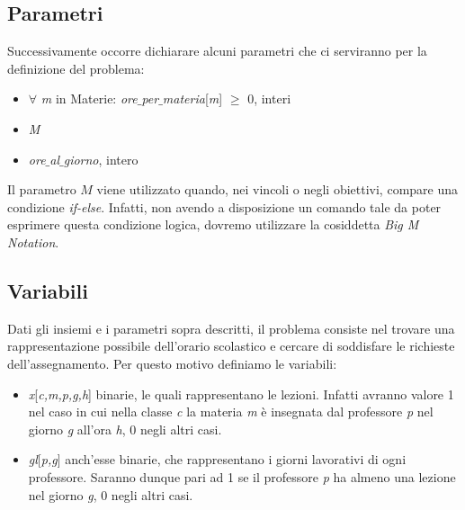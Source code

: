 \documentclass{article}
\begin{document}
\subsection{Parametri}
Successivamente occorre dichiarare alcuni parametri che ci serviranno per la definizione del problema:
\begin{itemize}
    \item $\forall$ \emph{m} in Materie: \emph{ore$\_$per$\_$materia}[\emph{m}] $\ge$ 0, interi
    \item \emph{M}
    \item \emph{ore$\_$al$\_$giorno}, intero
\end{itemize}
Il parametro $M$ viene utilizzato quando, nei vincoli o negli obiettivi, compare una condizione \emph{if-else}. Infatti, non avendo a disposizione un comando tale da poter esprimere questa condizione logica, dovremo utilizzare la cosiddetta \emph{Big M Notation}.
\subsection{Variabili}
Dati gli insiemi e i parametri sopra descritti, il problema consiste nel trovare una rappresentazione possibile dell'orario scolastico e cercare di soddisfare le richieste dell'assegnamento. Per questo motivo definiamo le variabili:
\begin{itemize}
    \item \emph{x}[\emph{c,m,p,g,h}] binarie, le quali rappresentano le lezioni. Infatti avranno valore 1 nel caso in cui nella classe \emph{c} la materia \emph{m} è insegnata dal professore \emph{p} nel giorno \emph{g} all'ora \emph{h}, 0 negli altri casi.
    \item \emph{gl}[\emph{p,g}] anch'esse binarie, che rappresentano i giorni lavorativi di ogni professore. Saranno dunque pari ad 1 se il professore \emph{p} ha almeno una lezione nel giorno \emph{g}, 0 negli altri casi.
\end{itemize}
\end{document}
